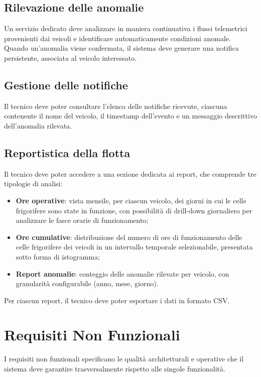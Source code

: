 \subsection{Rilevazione delle anomalie}

Un servizio dedicato deve analizzare in maniera continuativa i flussi telemetrici provenienti dai veicoli e identificare automaticamente condizioni anomale. Quando un'anomalia viene confermata, il sistema deve generare una notifica persistente, associata al veicolo interessato.

\subsection{Gestione delle notifiche}

Il tecnico deve poter consultare l'elenco delle notifiche ricevute, ciascuna contenente il nome del veicolo, il timestamp dell'evento  e un messaggio descrittivo dell'anomalia rilevata.

\subsection{Reportistica della flotta}

Il tecnico deve poter accedere a una sezione dedicata ai report, che comprende tre tipologie di analisi:
\begin{itemize}
    \item \textbf{Ore operative}: vista mensile, per ciascun veicolo, dei giorni in cui le celle frigorifere sono state in funzione, con possibilità di drill-down giornaliero per analizzare le fasce orarie di funzionamento;
    \item \textbf{Ore cumulative}: distribuzione del numero di ore di funzionamento delle celle frigorifere dei veicoli in un intervallo temporale selezionabile, presentata sotto forma di istogramma;
    \item \textbf{Report anomalie}: conteggio delle anomalie rilevate per veicolo, con granularità configurabile (anno, mese, giorno).
\end{itemize}
Per ciascun report, il tecnico deve poter esportare i dati in formato CSV.

\section{Requisiti Non Funzionali}

I requisiti non funzionali specificano le qualità architetturali e operative che il sistema deve garantire trasversalmente rispetto alle singole funzionalità.

